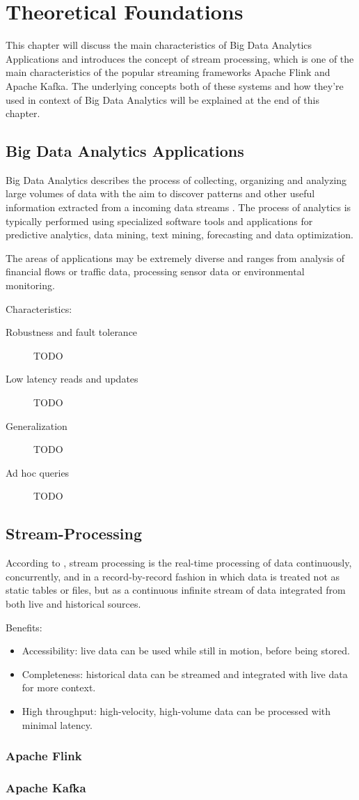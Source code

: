 \chapter{Theoretical Foundations}

This chapter will discuss the main characteristics of Big Data Analytics Applications and
introduces the concept of stream processing, which is one of the main characteristics of the
popular streaming frameworks Apache Flink and Apache Kafka. The underlying concepts both of
these systems and how they're used in context of Big Data Analytics will be explained at the
end of this chapter.

\section{Big Data Analytics Applications}

Big Data Analytics describes the process of collecting, organizing and analyzing large volumes
of data with the aim to discover patterns and other useful information extracted from a incoming
data streams \cite{Marz15}. The process of analytics is typically performed using specialized software tools and
applications for predictive analytics, data mining, text mining, forecasting and data optimization.

The areas of applications may be extremely diverse and ranges from analysis of financial flows or
traffic data, processing sensor data or environmental monitoring.

Characteristics:
\begin{description}
    \item [Robustness and fault tolerance] TODO
    \item [Low latency reads and updates] TODO
    \item [Generalization] TODO
    \item [Ad hoc queries] TODO
\end{description}

\section{Stream-Processing}
According to \cite{Klepp16}, stream processing is the real-time processing of data continuously,
concurrently, and in a record-by-record fashion in which data is treated not as static tables
or files, but as a continuous infinite stream of data integrated from both live and historical
sources.

Benefits:
\begin{itemize}
	\item Accessibility: live data can be used while still in motion, before being stored.
	\item Completeness: historical data can be streamed and integrated with live data for more context.
	\item High throughput: high-velocity, high-volume data can be processed with minimal latency.
\end{itemize}
\subsection{Apache Flink}
\subsection{Apache Kafka}